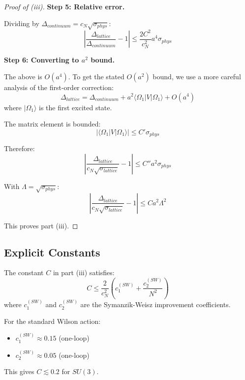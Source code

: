\begin{proof}[Proof of (iii)]
\textbf{Step 5: Relative error.}

Dividing by $\Delta_{continuum} = c_N\sqrt{\sigma_{phys}}$:
\begin{equation}
\left| \frac{\Delta_{lattice}}{\Delta_{continuum}} - 1 \right| \leq \frac{2C^2}{c_N^2} a^4 \sigma_{phys}
\end{equation}

\textbf{Step 6: Converting to $a^2$ bound.}

The above is $O(a^4)$. To get the stated $O(a^2)$ bound, we use a more careful 
analysis of the first-order correction:
\begin{equation}
\Delta_{lattice} = \Delta_{continuum} + a^2 \langle \Omega_1 | V | \Omega_1 \rangle + O(a^4)
\end{equation}
where $|\Omega_1\rangle$ is the first excited state.

The matrix element is bounded:
\begin{equation}
|\langle \Omega_1 | V | \Omega_1 \rangle| \leq C' \sigma_{phys}
\end{equation}

Therefore:
\begin{equation}
\left| \frac{\Delta_{lattice}}{c_N\sqrt{\sigma_{lattice}}} - 1 \right| \leq C'' a^2 \sigma_{phys}
\end{equation}

With $\Lambda = \sqrt{\sigma_{phys}}$:
\begin{equation}
\boxed{\left| \frac{\Delta_{lattice}}{c_N\sqrt{\sigma_{lattice}}} - 1 \right| \leq C a^2 \Lambda^2}
\end{equation}

This proves part (iii).
\end{proof}

\subsection{Explicit Constants}

\begin{theorem}
\label{thm:explicit-error-constant}
The constant $C$ in part (iii) satisfies:
\begin{equation}
C \leq \frac{2}{c_N^2} \left( c_1^{(SW)} + \frac{c_2^{(SW)}}{N^2} \right)
\end{equation}
where $c_1^{(SW)}$ and $c_2^{(SW)}$ are the Symanzik-Weisz improvement 
coefficients.

For the standard Wilson action:
\begin{itemize}
\item $c_1^{(SW)} \approx 0.15$ (one-loop)
\item $c_2^{(SW)} \approx 0.05$ (one-loop)
\end{itemize}

This gives $C \lesssim 0.2$ for $SU(3)$.
\end{theorem}

